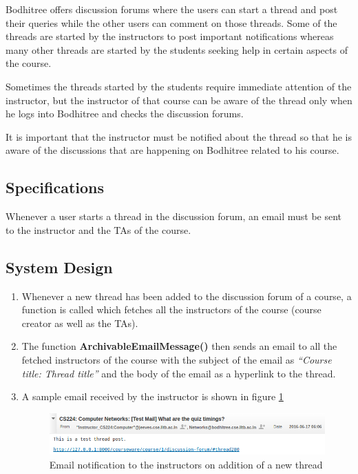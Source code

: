 \hspace{0.35cm} Bodhitree offers discussion forums where the users can start a thread and post their queries while the other users can comment on those threads. Some of the threads are started by the instructors to post important notifications whereas many other threads are started by the students seeking help in certain aspects of the course.
\par Sometimes the threads started by the students require immediate attention of the instructor, but the instructor of that course can be aware of the thread only when he logs into Bodhitree and checks the discussion forums.
\par It is important that the instructor must be notified about the thread so that he is aware of the discussions that are happening on Bodhitree related to his course.

\subsection{Specifications}

\hspace{0.35cm} Whenever a user starts a thread in the discussion forum, an email must be sent to the instructor and the TAs of the course.

\subsection{System Design}

\begin{enumerate}
	\item Whenever a new thread has been added to the discussion forum of a course, a function is called which fetches all the instructors of the course (course creator as well as the TAs).
	\item The function \textbf{ArchivableEmailMessage()} then sends an email to all the fetched instructors of the course with the subject of the email as \textit{``Course title: Thread title''} and the body of the email as a hyperlink to the thread.
	\item A sample email received by the instructor is shown in figure \ref{fig:instructor-email}
	\begin{figure}[h]
	\centering
	\includegraphics[width=0.95\linewidth]{./media/instructors_mail}
	\caption{Email notification to the instructors on addition of a new thread}
	\label{fig:instructor-email}
	\end{figure}
	
\end{enumerate}